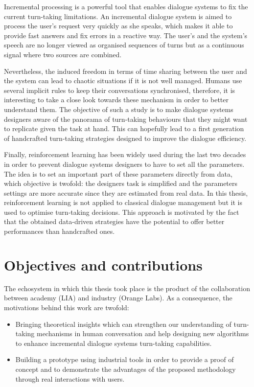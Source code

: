 				Incremental processing is a powerful tool that enables dialogue systems to fix the current turn-taking limitations. An incremental dialogue system is aimed to process the user's request very quickly as she speaks, which makes it able to provide fast answers and fix errors in a reactive way. The user's and the system's speech are no longer viewed as organised sequences of turns but as a continuous signal where two sources are combined.
				
				Nevertheless, the induced freedom in terms of time sharing between the user and the system can lead to chaotic situations if it is not well managed. Humans use several implicit rules to keep their conversations synchronised, therefore, it is interesting to take a close look towards these mechanism in order to better understand them. The objective of such a study is to make dialogue systems designers aware of the panorama of turn-taking behaviours that they might want to replicate given the task at hand. This can hopefully lead to a first generation of handcrafted turn-taking strategies designed to improve the dialogue efficiency.
				
				Finally, reinforcement learning has been widely used during the last two decades in order to prevent dialogue systems designers to have to set all the parameters. The idea is to set an important part of these parameters directly from data, which objective is twofold: the designers task is simplified and the parameters settings are more accurate since they are estimated from real data. In this thesis, reinforcement learning is not applied to classical dialogue management but it is used to optimise turn-taking decisions. This approach is motivated by the fact that the obtained data-driven strategies have the potential to offer better performances than handcrafted ones.
				
\section*{Objectives and contributions}

				The echosystem in which this thesis took place is the product of the collaboration between academy (LIA) and industry (Orange Labs). As a consequence, the motivations behind this work are twofold:
				
				\begin{itemize}
					\item Bringing theoretical insights which can strengthen our understanding of turn-taking mechanisms in human conversation and help designing new algorithms to enhance incremental dialogue systems turn-taking capabilities.
					\item Building a prototype using industrial tools in order to provide a proof of concept and to demonstrate the advantages of the proposed methodology through real interactions with users.
				\end{itemize}
				
